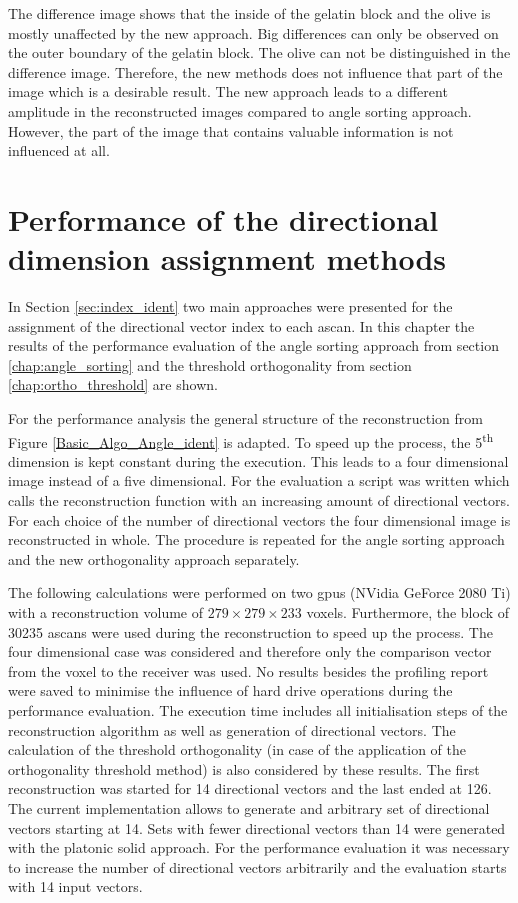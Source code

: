The difference image shows that the inside of the gelatin block and the olive is mostly unaffected by the new approach. Big differences can only be observed on the outer boundary of the gelatin block. The olive can not be distinguished in the difference image. Therefore, the new methods does not influence that part of the image which is a desirable result. The new approach leads to a different amplitude in the reconstructed images compared to angle sorting approach. However, the part of the image that contains valuable information is not influenced at all. 



\section{Performance of the directional dimension assignment methods}
\label{performance_index_ident}

In Section \ref{sec:index_ident} two main approaches were presented for the assignment of the directional vector index to each \ac{ascan}. In this chapter the results of the performance evaluation of the angle sorting approach from section \ref{chap:angle_sorting} and the threshold orthogonality from section \ref{chap:ortho_threshold} are shown. 

For the performance analysis the general structure of the reconstruction from Figure \ref{Basic_Algo_Angle_ident} is adapted. To speed up the process, the 5\textsuperscript{th} dimension is kept constant during the execution. This leads to a four dimensional image instead of a five dimensional. For the evaluation a script was written which calls the reconstruction function with an increasing amount of directional vectors. For each choice of the number of directional vectors the four dimensional image is reconstructed in whole. The procedure is repeated for the angle sorting approach and the new orthogonality approach separately.

The following calculations were performed on two \acp{gpu} (NVidia GeForce 2080 Ti) with a reconstruction volume of $279\times279\times233$ voxels. Furthermore, the block of 30235 \acp{ascan} were used during the reconstruction to speed up the process. The four dimensional case was considered and therefore only the comparison vector from the voxel to the receiver was used. No results besides the profiling report were saved to minimise the influence of hard drive operations during the performance evaluation. The execution time includes all initialisation steps of the reconstruction algorithm as well as generation of directional vectors. The calculation of the threshold orthogonality (in case of the application of the orthogonality threshold method) is also considered by these results. The first reconstruction was started for 14 directional vectors and the last ended at 126. The current implementation allows to generate and arbitrary set of directional vectors starting at 14. Sets with fewer directional vectors than 14 were generated with the platonic solid approach. For the performance evaluation it was necessary to increase the number of directional vectors arbitrarily and the evaluation starts with 14 input vectors.

